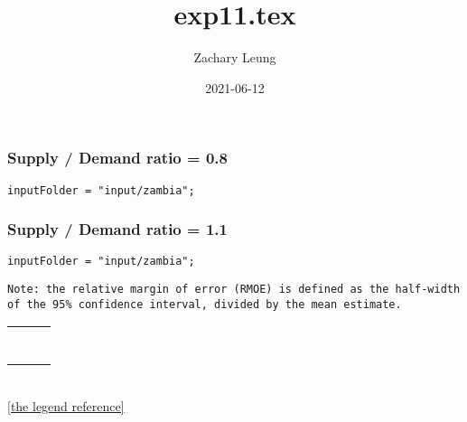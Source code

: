 \documentclass[12pt]{article}
\title{exp11.tex}
\author{Zachary Leung}
\date{2021-06-12}
\begin{document}
\maketitle



\subsubsection*{Supply / Demand ratio = 0.8}
\begin{verbatim}
inputFolder = "input/zambia";
\end{verbatim}




\subsubsection*{Supply / Demand ratio = 1.1}
\begin{verbatim}
inputFolder = "input/zambia";
\end{verbatim}


\begin{verbatim}
Note: the relative margin of error (RMOE) is defined as the half-width
of the 95% confidence interval, divided by the mean estimate.
\end{verbatim}








\clearpage
\begin{center}
\begin{tabular}{MM}
%
&
%
\\
~&~
\\[-3mm]
%
&
%
\end{tabular}
~\\[2mm]
\ref{the legend reference}
\end{center}
\end{document}
